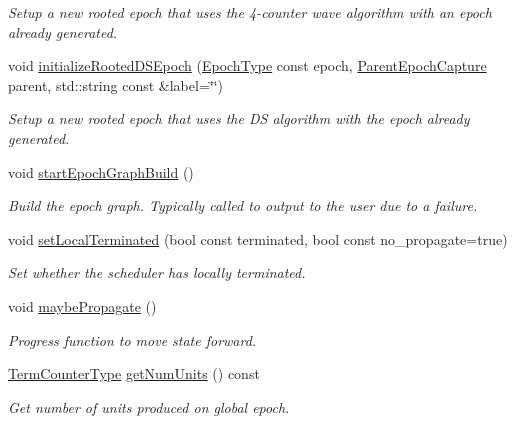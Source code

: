 \begin{DoxyCompactItemize}
\begin{DoxyCompactList}\small\item\em Setup a new rooted epoch that uses the 4-\/counter wave algorithm with an epoch already generated. \end{DoxyCompactList}\item 
void \hyperlink{structvt_1_1term_1_1_termination_detector_abde094c3bca75435fb56ef3eb5e6512c}{initialize\+Rooted\+D\+S\+Epoch} (\hyperlink{namespacevt_a81d11b28122d43bf9834577e4a06440f}{Epoch\+Type} const epoch, \hyperlink{structvt_1_1term_1_1_parent_epoch_capture}{Parent\+Epoch\+Capture} parent, std\+::string const \&label=\char`\"{}\char`\"{})
\begin{DoxyCompactList}\small\item\em Setup a new rooted epoch that uses the DS algorithm with the epoch already generated. \end{DoxyCompactList}\item 
void \hyperlink{structvt_1_1term_1_1_termination_detector_a782a54afd99943982ce455416828ea66}{start\+Epoch\+Graph\+Build} ()
\begin{DoxyCompactList}\small\item\em Build the epoch graph. Typically called to output to the user due to a failure. \end{DoxyCompactList}\item 
void \hyperlink{structvt_1_1term_1_1_termination_detector_acb639c048af01c8d67c82db0227888a4}{set\+Local\+Terminated} (bool const terminated, bool const no\+\_\+propagate=true)
\begin{DoxyCompactList}\small\item\em Set whether the scheduler has locally terminated. \end{DoxyCompactList}\item 
void \hyperlink{structvt_1_1term_1_1_termination_detector_a4a54157fff0152b531b26c4a18393049}{maybe\+Propagate} ()
\begin{DoxyCompactList}\small\item\em Progress function to move state forward. \end{DoxyCompactList}\item 
\hyperlink{namespacevt_1_1term_a4fd378cdb0c36683afc1b3399d685f7f}{Term\+Counter\+Type} \hyperlink{structvt_1_1term_1_1_termination_detector_aa5802cb6f199f3359b1a85058102220c}{get\+Num\+Units} () const
\begin{DoxyCompactList}\small\item\em Get number of units produced on global epoch. \end{DoxyCompactList}\item 

\end{DoxyCompactItemize}
